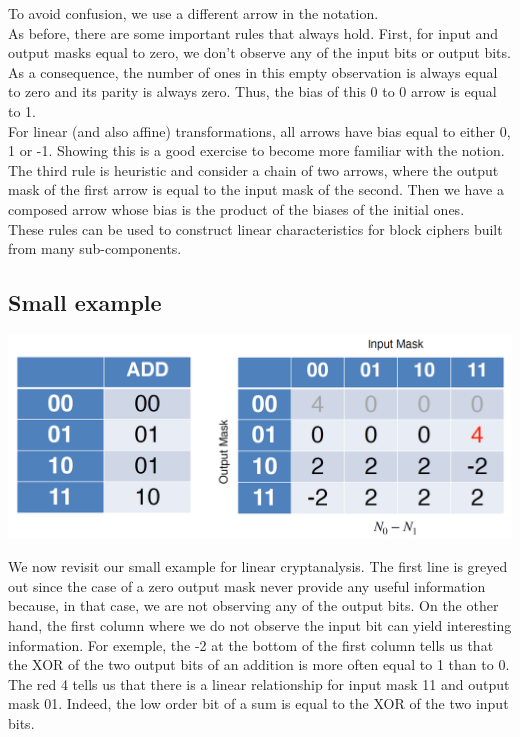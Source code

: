 		To avoid confusion, we use a different arrow in the notation.\\
		As before, there are some important rules that always hold. 
		First, for input and output masks equal to zero, we don’t observe any of the input bits or output bits. 
		As a consequence, the number of ones in this empty observation is always equal to zero and its parity is always zero. 
		Thus, the bias of this 0 to 0 arrow is equal to 1.\\
		For linear (and also affine) transformations, all arrows have bias equal to either 0, 1 or -1. 
		Showing this is a good exercise to become more familiar with the notion.\\
		The third rule is heuristic and consider a chain of two arrows, where the output mask of the first arrow is equal to the input mask of the second. 
		Then we have a composed arrow whose bias is the product of the biases of the initial ones.\\
		These rules can be used to construct linear characteristics for block ciphers built from many sub-components.
	
	\subsection{Small example}
		\begin{center}
			\includegraphics[width=140mm]{Graphics/Cryptanalysis/c7.png}
		\end{center}
		We now revisit our small example for linear cryptanalysis. 
		The first line is greyed out since the case of a zero output mask never provide any useful information because, in that case, we are not observing any of the output bits. 
		On the other hand, the first column where we do not observe the input bit can yield interesting information. 
		For exemple, the -2 at the bottom of the first column tells us that the XOR of the two output bits of an addition is more often equal to 1 than to 0. 
		The red 4 tells us that there is a linear relationship for input mask 11 and output mask 01.
		Indeed, the low order bit of a sum is equal to the XOR of the two input bits.

